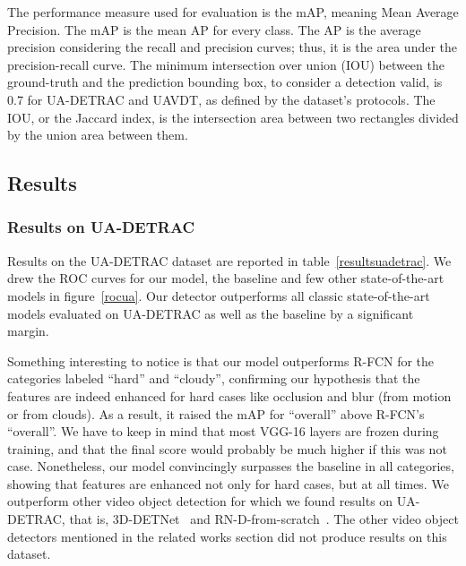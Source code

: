 \documentclass[runningheads]{llncs}
\begin{document}
The performance measure used for evaluation is the mAP, meaning Mean Average Precision. The mAP is the mean AP for every class. The AP is the average precision considering the recall and precision curves; thus, it is the area under the precision-recall curve. The minimum intersection over union (IOU) between the ground-truth and the prediction bounding box, to consider a detection valid, is 0.7 for UA-DETRAC and UAVDT, as defined by the dataset’s protocols. The IOU, or the Jaccard index, is the intersection area between two rectangles divided by the union area between them.

\subsection{Results}

\subsubsection{Results on UA-DETRAC}
Results on the UA-DETRAC dataset are reported in table~\ref{resultsuadetrac}. We drew the ROC curves for our model, the baseline and few other state-of-the-art models in figure~\ref{rocua}. Our detector outperforms all classic state-of-the-art models evaluated on UA-DETRAC as well as the baseline by a significant margin.

Something interesting to notice is that our model outperforms R-FCN for the categories labeled ``hard'' and ``cloudy'', confirming our hypothesis that the features are indeed enhanced for hard cases like occlusion and blur (from motion or from clouds). As a result, it raised the mAP for ``overall'' above R-FCN's ``overall''. We have to keep in mind that most VGG-16 layers are frozen during training, and that the final score would probably be much higher if this was not case. Nonetheless, our model convincingly surpasses the baseline in all categories, showing that features are enhanced not only for hard cases, but at all times. We outperform other video object detection for which we found results on UA-DETRAC, that is, 3D-DETNet~\cite{3D_detnet_li20183d} and RN-D-from-scratch~\cite{perreault2019road}. The other video object detectors mentioned in the related works section did not produce results on this dataset.
\end{document}
